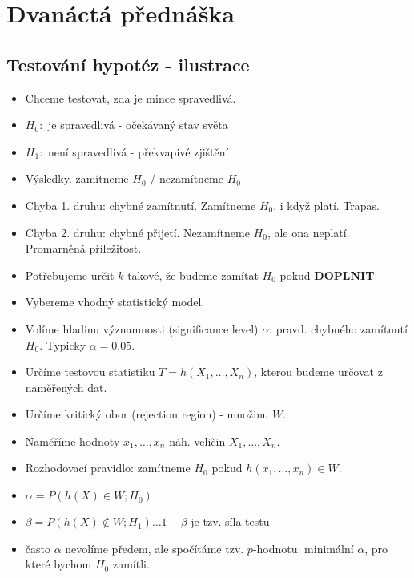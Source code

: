 \documentclass[../main.tex]{subfiles}
\begin{document}
\section{Dvanáctá přednáška}

\subsection{Testování hypotéz - ilustrace}
\begin{itemize}
    \item Chceme testovat, zda je mince spravedlivá.
    \item $H_0:$ je spravedlivá - očekávaný stav světa
    \item $H_1:$ není spravedlivá - překvapivé zjištění
    \item Výsledky. zamítneme $H_0$ / nezamítneme $H_0$
    \item Chyba 1. druhu: chybné zamítnutí. Zamítneme $H_0$, i když platí. Trapas.
    \item Chyba 2. druhu: chybné přijetí. Nezamítneme $H_0$, ale ona neplatí. Promarněná příležitost.
    \item Potřebujeme určit $k$ takové, že budeme zamítat $H_0$ pokud \textbf{DOPLNIT}
\end{itemize}
\begin{itemize}
    \item Vybereme vhodný statistický model.
    \item Volíme hladinu významnosti (significance level) $\alpha$: pravd. chybného zamítnutí $H_0$. Typicky $\alpha = 0.05$.
    \item Určíme testovou statistiku $T = h(X_1,\dots,X_n)$, kterou budeme určovat z naměřených dat.
    \item Určíme kritický obor (rejection region) - množinu $W$.
    \item Naměříme hodnoty $x_1,\dots,x_n$ náh. veličin $X_1,\dots,X_n$.
    \item Rozhodovací pravidlo: zamítneme $H_0$ pokud $h(x_1,\dots,x_n) \in W$.
    \item $\alpha = P(h(X) \in W; H_0)$
    \item $\beta = P(h(X) \notin W; H_1) \dots 1 - \beta$ je tzv. síla testu
    \item často $\alpha$ nevolíme předem, ale spočítáme tzv. $p$-hodnotu: minimální $\alpha$, pro které bychom $H_0$ zamítli.
\end{itemize}
\end{document}

